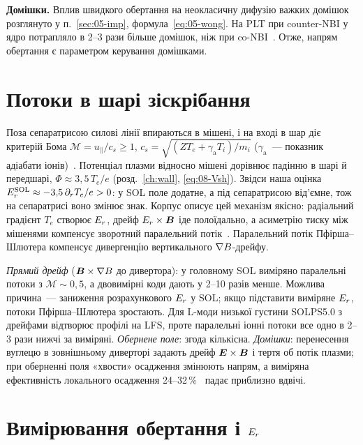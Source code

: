 \textbf{Домішки.} Вплив швидкого обертання на неокласичну дифузію важких домішок розглянуто у п.~\ref{sec:05-imp}, формула~\eqref{eq:05-wong}. На PLT при counter-NBI у ядро потрапляло в 2--3 рази більше домішок, ніж при co-NBI~\cite[с.~3]{Wong1987}. Отже, напрям обертання є параметром керування домішками.

\section{Потоки в шарі зіскрібання}\label{sec:06-sol}

Поза сепаратрисою силові лінії впираються в мішені, і на вході в шар діє критерій Бома $\mathcal{M}=u_\parallel/c_s\ge1$, $c_s=\sqrt{(ZT_e+\gamma_{\mathrm a}T_i)/m_i}$ ($\gamma_{\mathrm a}$~--- показник адіабати іонів)~\cite[с.~24]{AhoMantila2011}. Потенціал плазми відносно мішені дорівнює падінню в шарі й передшарі, $\Phi\approx3{,}5\,T_e/e$ (розд.~\ref{ch:wall}, \eqref{eq:08-Vsh}). Звідси наша оцінка $E_{r}^{\mathrm{SOL}}\approx-3{,}5\,\partial_rT_e/e>0$: у SOL поле додатне, а під сепаратрисою від'ємне, тож на сепаратрисі воно змінює знак. Корпус описує цей механізм якісно: радіальний градієнт $T_e$ створює $E_{r}$, дрейф $E_{r}\times\bm{B}$ іде полоїдально, а асиметрію тиску між мішенями компенсує зворотний паралельний потік~\cite{AhoMantila2011}. Паралельний потік Пфірша--Шлютера компенсує дивергенцію вертикального $\nabla B$-дрейфу.

\begin{corpusexample}
\emph{Прямий дрейф} ($\bm{B}\times\nabla B$ до дивертора): у головному SOL виміряно паралельні потоки з $\mathcal{M}\sim0{,}5$, а двовимірні коди дають у 2--10 разів менше. Можлива причина~--- заниження розрахункового $E_{r}$ у SOL; якщо підставити виміряне $E_{r}$, потоки Пфірша--Шлютера зростають. Для L-моди низької густини SOLPS5.0 з дрейфами відтворює профілі на LFS, проте паралельні іонні потоки все одно в 2--3 рази нижчі за виміряні. \emph{Обернене поле}: згода кількісна. \emph{Домішки}: перенесення вуглецю в зовнішньому диверторі задають дрейф $\bm{E}\times\bm{B}$ і тертя об потік плазми; при оберненні поля «хвости» осадження змінюють напрям, а виміряна ефективність локального осадження 24--32\,\%~\cite[с.~63]{AhoMantila2011} падає приблизно вдвічі.
\end{corpusexample}

\section{Вимірювання обертання і \texorpdfstring{$E_{r}$}{Er}}\label{sec:06-meas}

